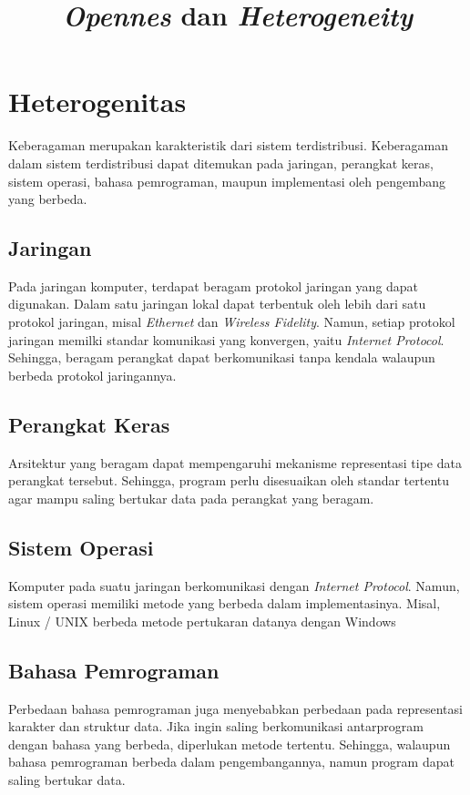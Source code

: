 \documentclass[12pt,a4paper]{apa}
\title{\textbf{\textit{Opennes} dan \textit{Heterogeneity}}}
\begin{document}
	\maketitle
	\section{\textbf{Heterogenitas}}
	Keberagaman merupakan karakteristik dari sistem terdistribusi. Keberagaman dalam sistem terdistribusi dapat ditemukan pada jaringan, perangkat keras, sistem operasi, bahasa pemrograman, maupun implementasi oleh pengembang yang berbeda. \cite{Coulouris2012} \cite{Belapurkar2009}
	\subsection{\textbf{Jaringan}}
	Pada jaringan komputer, terdapat beragam protokol jaringan yang dapat digunakan. Dalam satu jaringan lokal dapat terbentuk oleh lebih dari satu protokol jaringan, misal \emph{Ethernet} dan \emph{Wireless Fidelity}. Namun, setiap protokol jaringan memilki standar komunikasi yang konvergen, yaitu \emph{Internet Protocol}. Sehingga, beragam perangkat dapat berkomunikasi tanpa kendala walaupun berbeda protokol jaringannya. \cite{Coulouris2012}
	\subsection{\textbf{Perangkat Keras}}
	Arsitektur yang beragam dapat mempengaruhi mekanisme representasi tipe data perangkat tersebut. Sehingga, program perlu disesuaikan oleh standar tertentu agar mampu saling bertukar data pada perangkat yang beragam. \cite{Coulouris2012}
	\subsection{\textbf{Sistem Operasi}}
	Komputer pada suatu jaringan berkomunikasi dengan \emph{Internet Protocol}. Namun, sistem operasi memiliki metode yang berbeda dalam implementasinya. Misal, Linux / UNIX berbeda metode pertukaran datanya dengan Windows \cite{Coulouris2012}
	\subsection{\textbf{Bahasa Pemrograman}}
	Perbedaan bahasa pemrograman juga menyebabkan perbedaan pada representasi karakter dan struktur data. Jika ingin saling berkomunikasi antarprogram dengan bahasa yang berbeda, diperlukan metode tertentu. Sehingga, walaupun bahasa pemrograman berbeda dalam pengembangannya, namun program dapat saling bertukar data. \cite{Coulouris2012}
\end{document}
